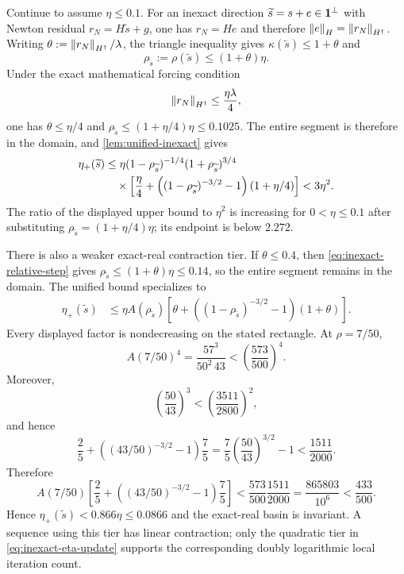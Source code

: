 Continue to assume $\eta\le0.1$.  For an inexact direction
$\widetilde s=s+e\in\mathbf{1}^\perp$ with Newton residual
$r_N=H\widetilde s+g$, one has
$r_N=He$ and therefore
$\left\lVert e\right\rVert_H=\left\lVert r_N\right\rVert_{H^\dagger}$.  Writing
$\theta:=\left\lVert r_N\right\rVert_{H^\dagger}/\lambda$, the triangle inequality gives
$\kappa(\widetilde s)\le1+\theta$ and
\begin{equation}
 \rho_{\widetilde s}:=\rho(\widetilde s)
 \le(1+\theta)\eta.
 \label{eq:inexact-relative-step}
\end{equation}
Under the exact mathematical forcing condition
\begin{equation}
 \left\lVert r_N\right\rVert_{H^\dagger}\le\frac{\eta\lambda}{4},
 \label{eq:mathematical-forcing}
\end{equation}
one has $\theta\le\eta/4$ and
$\rho_{\widetilde s}\le(1+\eta/4)\eta\le0.1025$.  The entire segment is
therefore in the domain, and 
\cref{lem:unified-inexact} gives
\begin{align}
 \eta_+(\widetilde s)
 &\le\eta(1-\rho_{\widetilde s})^{-1/4}
             (1+\rho_{\widetilde s})^{3/4} \notag\\
 &\quad{}\times\left[\frac{\eta}{4}+
 \left((1-\rho_{\widetilde s})^{-3/2}-1\right)(1+\eta/4)\right]
 <3\eta^2.
 \label{eq:inexact-eta-update}
\end{align}
The ratio of the displayed upper bound to $\eta^2$ is increasing for
$0<\eta\le0.1$ after substituting
$\rho_{\widetilde s}=(1+\eta/4)\eta$; its endpoint is below $2.272$.

There is also a weaker exact-real contraction tier.  If $\theta\le0.4$, then
\cref{eq:inexact-relative-step} gives
$\rho_{\widetilde s}\le(1+\theta)\eta\le0.14$, so the entire segment remains
in the domain.  The unified bound specializes to
\begin{align}
 \eta_+(\widetilde s)
 &\le \eta A(\rho_{\widetilde s})
 \left[\theta+
 \left((1-\rho_{\widetilde s})^{-3/2}-1\right)(1+\theta)\right].
 \label{eq:contraction-tier}
\end{align}
Every displayed factor is nondecreasing on the stated rectangle.  At
$\rho=7/50$,
\[
 A(7/50)^4=\frac{57^3}{50^2\,43}
 <\left(\frac{573}{500}\right)^4.
\]
Moreover,
\[
 \left(\frac{50}{43}\right)^3
 <\left(\frac{3511}{2800}\right)^2,
\]
and hence
\[
 \frac25+\left((43/50)^{-3/2}-1\right)\frac75
 =\frac75\left(\frac{50}{43}\right)^{3/2}-1
 <\frac{1511}{2000}.
\]
Therefore
\[
 A(7/50)\left[
 \frac25+\left((43/50)^{-3/2}-1\right)\frac75
 \right]
 <\frac{573}{500}\frac{1511}{2000}
 =\frac{865803}{10^6}<\frac{433}{500}.
\]
Hence
$\eta_+(\widetilde s)<0.866\eta\le0.0866$ and the exact-real basin is
invariant.  A sequence using this tier has linear contraction; only the
quadratic tier in \cref{eq:inexact-eta-update} supports the corresponding
doubly logarithmic local iteration count.

